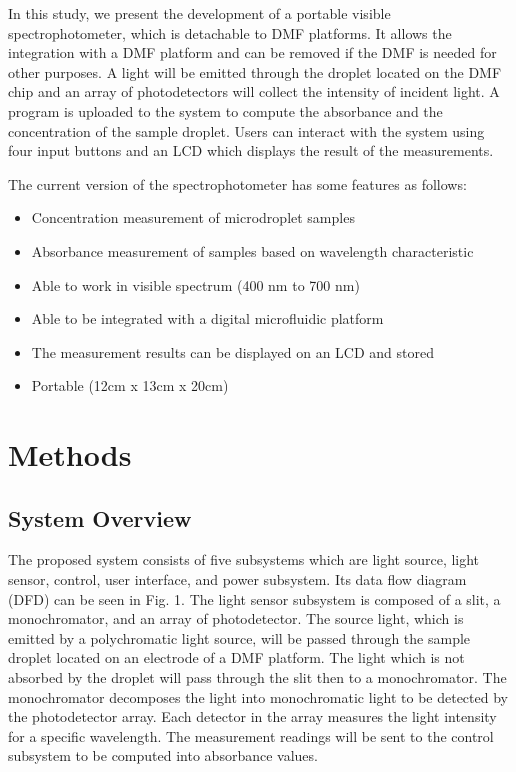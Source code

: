 \documentclass[conference]{IEEEtran}
\begin{document}
In this study, we present the development of a portable visible spectrophotometer, which is detachable to DMF platforms. It allows the integration with a DMF platform and can be removed if the DMF is needed for other purposes. A light will be emitted through the droplet located on the DMF chip and an array of photodetectors will collect the intensity of incident light. A program is uploaded to the system to compute the absorbance and the concentration of the sample droplet. Users can interact with the system using four input buttons and an LCD which displays the result of the measurements. 

The current version of the spectrophotometer has some features as follows:
\begin{itemize}
    \item Concentration measurement of microdroplet samples 
    \item Absorbance measurement of samples based on wavelength characteristic 
    \item Able to work in visible spectrum (400 nm to 700 nm) 
    \item Able to be integrated with a digital microfluidic platform 
    \item The measurement results can be displayed on an LCD and stored 
    \item Portable (12cm x 13cm x 20cm)
\end{itemize}

\section{Methods}
\subsection{System Overview}
The proposed system consists of five subsystems which are light source, light sensor, control, user interface, and power subsystem. Its data flow diagram (DFD) can be seen in Fig. 1. The light sensor subsystem is composed of a slit, a monochromator, and an array of photodetector. The source light, which is emitted by a polychromatic light source, will be passed through the sample droplet located on an electrode of a DMF platform. The light which is not absorbed by the droplet will pass through the slit then to a monochromator. The monochromator decomposes the light into monochromatic light to be detected by the photodetector array. Each detector in the array measures the light intensity for a specific wavelength. The measurement readings will be sent to the control subsystem to be computed into absorbance values. 
\end{document}
